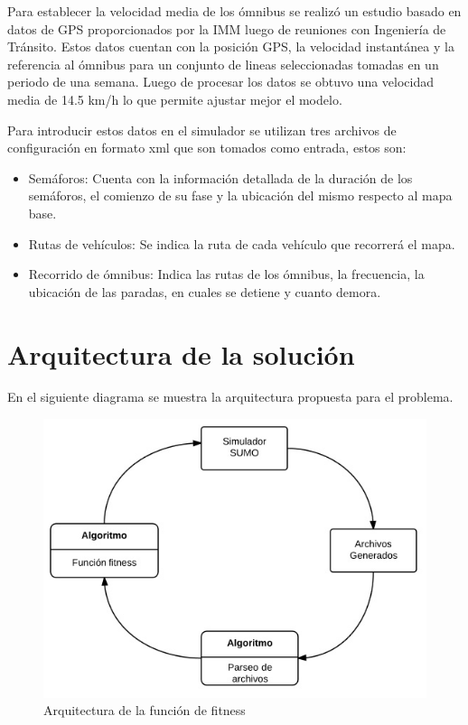 Para establecer la velocidad media de los ómnibus se realizó un estudio basado en datos de GPS proporcionados por la IMM luego de reuniones con Ingeniería de Tránsito.
Estos datos cuentan con la posición GPS, la velocidad instantánea y la referencia al ómnibus para un conjunto de lineas seleccionadas tomadas en un periodo de una semana. Luego de procesar los datos se obtuvo una velocidad media de 14.5 km/h lo que permite ajustar mejor el modelo. 

Para introducir estos datos en el simulador se utilizan tres archivos de configuración en formato xml que son tomados como entrada, estos son:

\begin{itemize}
	\item Semáforos: Cuenta con la información detallada de la duración de los semáforos, el comienzo de su fase y la ubicación del mismo respecto al mapa base.
	\item Rutas de vehículos: Se indica la ruta de cada vehículo que recorrerá el mapa.
	\item Recorrido de ómnibus: Indica las rutas de los ómnibus, la frecuencia, la ubicación de las paradas, en cuales se detiene y cuanto demora.
\end{itemize}





\section{Arquitectura de la solución}

En el siguiente diagrama se muestra la arquitectura propuesta para el problema.

\begin{figure}[H]
\centering
\includegraphics[width=0.7\linewidth]{Figures/arquitectura1}
\caption{Arquitectura de la función de fitness}
\label{fig:arquitectura1}
\end{figure}

